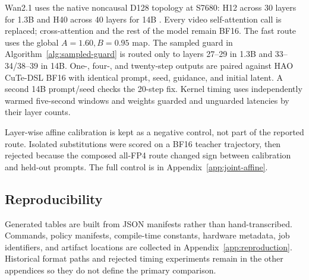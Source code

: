 Wan2.1 uses the native noncausal D128 topology at S7680: H12 across 30 layers
for 1.3B and H40 across 40 layers for 14B \cite{wanteam2025wan}. Every video
self-attention call is replaced; cross-attention and the rest of the model
remain BF16. The fast route uses the global $A=1.60,B=0.95$ map. The sampled
guard in Algorithm~\ref{alg:sampled-guard} is routed only to layers 27--29 in
1.3B and 33--34/38--39 in 14B. One-, four-, and twenty-step outputs are paired
against HAO CuTe-DSL BF16 with identical prompt, seed, guidance, and initial
latent. A second 14B prompt/seed checks the 20-step fix. Kernel timing uses
independently warmed five-second windows and weights guarded and unguarded
latencies by their layer counts.

Layer-wise affine calibration is kept as a negative control, not part of the
reported route. Isolated substitutions were scored on a BF16 teacher
trajectory, then rejected because the composed all-FP4 route changed sign
between calibration and held-out prompts. The full control is in
Appendix~\ref{app:joint-affine}.

\subsection{Reproducibility}

Generated tables are built from JSON manifests rather than hand-transcribed.
Commands, policy manifests, compile-time constants, hardware metadata, job
identifiers, and artifact locations are collected in
Appendix~\ref{app:reproduction}. Historical format paths and rejected timing
experiments remain in the other appendices so they do not define the primary
comparison.
